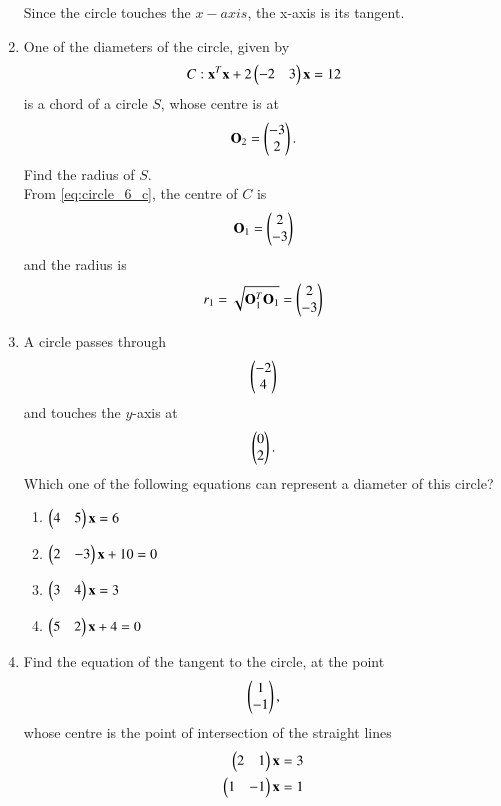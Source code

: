 \documentclass[journal,12pt,twocolumn]{IEEEtran}
\begin{document}
\begin{enumerate}[label=\arabic*]
Since the circle touches the $x-axis$, the x-axis is its tangent.
\item One of the diameters of the circle, given by 
\begin{equation}
C: \mathbf{x}^T\mathbf{x} +2\begin{pmatrix}-2 & 3 \end{pmatrix}\mathbf{x} = 12
\label{eq:circle_6_c}
\end{equation}
is a chord of a circle $S$, whose centre is at 
\begin{equation}
\mathbf{O}_2=\begin{pmatrix}-3\\ 2\end{pmatrix}.
\label{eq:circle_6_o2}
\end{equation}
Find the radius of $S$.
\\
\solution From \eqref{eq:circle_6_c}, the centre of $C$ is 
\begin{align}
\mathbf{O}_1 = \begin{pmatrix}2\\ -3\end{pmatrix} 
\label{eq:circle_6_p}
\end{align}
%
and the radius is 
\begin{align}
r_1 = \sqrt{\mathbf{O}_1^T\mathbf{O}_1} = \begin{pmatrix}2\\ -3\end{pmatrix} 
\label{eq:circle_6_p}
\end{align}
\item A circle passes through 
\begin{equation} 
\begin{pmatrix}-2\\ 4\end{pmatrix} 
\end{equation} 
and touches the $y$-axis at 
\begin{equation} 
\begin{pmatrix}0\\ 2\end{pmatrix}. 
\end{equation}
Which one of the  following equations can represent a diameter of this circle?
\begin{enumerate} 
\item $\begin{pmatrix}4 & 5\end{pmatrix}\mathbf{x} = 6 $
\item $\begin{pmatrix}2 & -3\end{pmatrix}\mathbf{x} +10 = 0 $
\item $\begin{pmatrix}3 & 4\end{pmatrix}\mathbf{x} = 3 $
\item $\begin{pmatrix}5 & 2\end{pmatrix}\mathbf{x} +4= 0 $
\end{enumerate} 
\item Find the equation of the tangent to the circle, at the point
\begin{equation}
\begin{pmatrix}1\\ -1\end{pmatrix},
\end{equation}
whose centre is the point of intersection of the straight lines
\begin{align} 
\begin{pmatrix}2 & 1\end{pmatrix}\mathbf{x} &= 3
\\
\begin{pmatrix}1 & -1\end{pmatrix}\mathbf{x} &= 1
\end{align} 


\end{enumerate}
\end{document}
